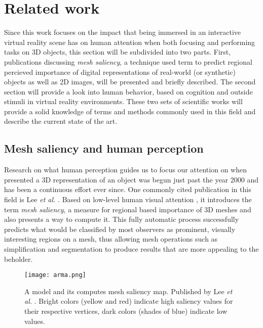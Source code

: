 \chapter{Related work}
\label{sec:related_work}

Since this work focuses on the impact that being immersed in an interactive virtual reality scene has on human attention when both focusing and performing tasks on 3D objects, this section will be subdivided into two parts.
First, publications discussing \textit{mesh saliency}, a technique used term to predict regional percieved importance of digital representations of real-world (or synthetic) objects as well as 2D images, will be presented and briefly described. The second section will provide a look into human behavior, based on cognition and outside stimuli in virtual reality environments. These two sets of scientific works will provide a solid knowledge of terms and methods commonly used in this field and describe the current state of the art.

\section{Mesh saliency and human perception}
\label{sec:mesh_saliency_and_human_perception}

Research on what human perception guides us to focus our attention on when presented a 3D representation of an object was begun just past the year 2000 and has been a continuous effort ever since. One commonly cited publication in this field is Lee \textit{et al.} \cite{lee2005mesh}. Based on low-level human visual attention \cite{koch1987shifts}, it introduces the term \textit{mesh saliency}, a measure for regional based importance of 3D meshes and also presents a way to compute it. This fully automatic process successfully predicts  what would be classified by most observers as prominent, visually interesting regions on a mesh, thus allowing mesh operations such as simplification \cite{cignoni1998comparison} and segmentation \cite{shamir2008survey} to produce results that are more appealing to the beholder.

\begin{figure}[htb]
  \centering
  \texttt{[image: arma.png]}\\ %
  \caption{A model and its computes mesh saliency map. Published by Lee \textit{et al.} \cite{lee2005mesh}. Bright colors (yellow and red) indicate high saliency values for their respective vertices, dark colors (shades of blue) indicate low values.}\label{fig:lee_arma_map}
\end{figure}

